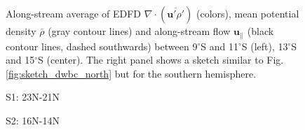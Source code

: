 \documentclass{ametsoc}
\begin{document}
\begin{figure}[h!]
\begin{minipage}[]{0.32\textwidth}
	\end{minipage}
	\caption{Along-stream average of EDFD $\nabla \cdot (\overline{\mathbf{u'}\rho'})$ (colors), mean potential density $\overline{\rho}$ (gray contour lines) and along-stream flow $\mathbf{u_{||}}$ (black contour lines, dashed southwards) between 9$^\circ$S and 11$^\circ$S (left), 13$^\circ$S and 15$^\circ$S (center). The right panel shows a sketch similar to Fig. \ref{fig:sketch_dwbc_north} but for the southern hemisphere. }
		\label{fig:results:EDFD_south}
\end{figure}

\begin{figure}[h!]
	\centering
	\begin{minipage}[]{0.32\textwidth}
	\centering S1: 23N-21N \\
	\end{minipage}
	\begin{minipage}[]{0.32\textwidth}
\centering S2: 16N-14N \\		
	\end{minipage}
	\begin{minipage}[]{0.32\textwidth}

\end{minipage}
\end{figure}
\end{document}
